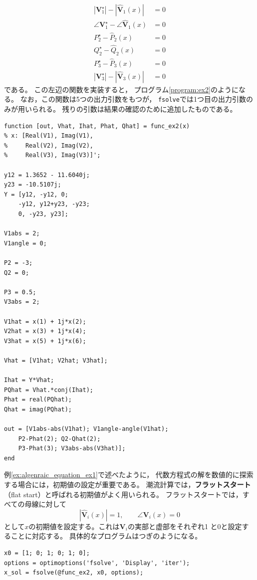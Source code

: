 \documentclass[tombow,dvipdfmx]{corona-a5-1.1}
\begin{document}
\begin{例}[潮流計算の実装法]
\begin{align*}
    |\bm V_1^{\star}|-|\hat{\bm V}_1(x)| &= 0\\
    \angle \bm V_1^{\star} - \angle \hat{\bm V}_1(x) &= 0\\
    P_2^{\star} -\hat P_2(x) &= 0\\
    Q_2^{\star} -\hat Q_2(x) &= 0\\
    P_3^{\star} -\hat P_3(x) &= 0\\
    |\bm V_3^{\star}|-|\hat{\bm V}_3(x)| &= 0
 \end{align*}
 である。
 この左辺の関数を実装すると，
 プログラム\nobreak\ref{program:ex2}のようになる。
 なお，この関数は5つの出力引数をもつが，
 \texttt{fsolve}では1つ目の出力引数のみが用いられる。
 残りの引数は結果の確認のために追加したものである。


\smallskip
\begin{PROGRAMA}[count, title={func\_ex2.m}]\label{program:ex2}
\begin{verbatim}
function [out, Vhat, Ihat, Phat, Qhat] = func_ex2(x)
% x: [Real(V1), Imag(V1),
%     Real(V2), Imag(V2),
%     Real(V3), Imag(V3)]';

y12 = 1.3652 - 11.6040j;
y23 = -10.5107j;
Y = [y12, -y12, 0;
    -y12, y12+y23, -y23;
    0, -y23, y23];

V1abs = 2;
V1angle = 0;

P2 = -3;
Q2 = 0;

P3 = 0.5;
V3abs = 2;

V1hat = x(1) + 1j*x(2);
V2hat = x(3) + 1j*x(4);
V3hat = x(5) + 1j*x(6);

Vhat = [V1hat; V2hat; V3hat];

Ihat = Y*Vhat;
PQhat = Vhat.*conj(Ihat);
Phat = real(PQhat);
Qhat = imag(PQhat);

out = [V1abs-abs(V1hat); V1angle-angle(V1hat);
    P2-Phat(2); Q2-Qhat(2);
    P3-Phat(3); V3abs-abs(V3hat)];
end
\end{verbatim}
\end{PROGRAMA}

例\nobreak\ref{ex:algenraic_equation_ex1}で述べたように，
代数方程式の解を数値的に探索する場合には，初期値の設定が重要である。
潮流計算では，\textbf{フラットスタート}（flat start）と呼ばれる初期値がよく用いられる。
フラットスタートでは，すべての母線に対して
\[
|\hat{\bm V}_i(x)|=1
,\qquad
\angle \bm V_i(x) = 0
\]
として$x$の初期値を設定する。これは$\bm V_i$の実部と虚部をそれぞれ1
と0と設定することに対応する。
具体的なプログラムはつぎのようになる。

\smallskip
\begin{PROGRAMA}[count,title={main\_ex2.m}]\label{program:ex2_main}
\begin{verbatim}
x0 = [1; 0; 1; 0; 1; 0];
options = optimoptions('fsolve', 'Display', 'iter');
x_sol = fsolve(@func_ex2, x0, options);


\end{verbatim}
\end{PROGRAMA}
\end{例}
\end{document}
